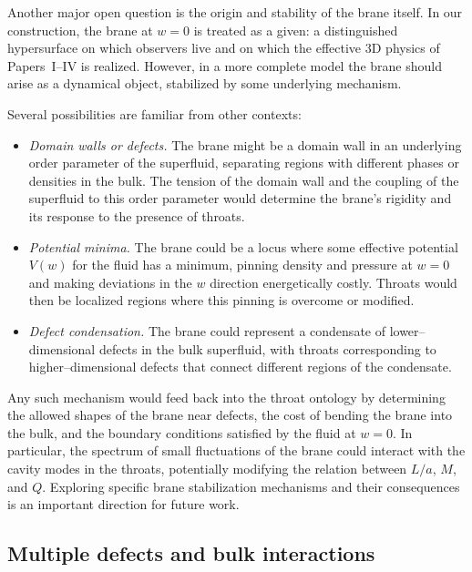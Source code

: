 \documentclass[12pt]{article}
\begin{document}
Another major open question is the origin and stability of the brane itself.
In our construction, the brane at $w=0$ is treated as a given: a
distinguished hypersurface on which observers live and on which the
effective 3D physics of Papers~I--IV is realized.  However, in a more
complete model the brane should arise as a dynamical object, stabilized by
some underlying mechanism.

Several possibilities are familiar from other contexts:

\begin{itemize}
  \item \emph{Domain walls or defects.}  The brane might be a domain wall in
        an underlying order parameter of the superfluid, separating regions
        with different phases or densities in the bulk.  The tension of the
        domain wall and the coupling of the superfluid to this order
        parameter would determine the brane's rigidity and its response to
        the presence of throats.

  \item \emph{Potential minima.}  The brane could be a locus where some
        effective potential $V(w)$ for the fluid has a minimum, pinning
        density and pressure at $w=0$ and making deviations in the $w$
        direction energetically costly.  Throats would then be localized
        regions where this pinning is overcome or modified.

  \item \emph{Defect condensation.}  The brane could represent a condensate
        of lower--dimensional defects in the bulk superfluid, with
        throats corresponding to higher--dimensional defects that connect
        different regions of the condensate.
\end{itemize}

Any such mechanism would feed back into the throat ontology by determining
the allowed shapes of the brane near defects, the cost of bending the brane
into the bulk, and the boundary conditions satisfied by the fluid at
$w=0$.  In particular, the spectrum of small fluctuations of the brane
could interact with the cavity modes in the throats, potentially modifying
the relation between $L/a$, $M$, and $Q$.  Exploring specific brane
stabilization mechanisms and their consequences is an important direction
for future work.

\subsection{Multiple defects and bulk interactions}
\label{subsec:multi_defects}
\end{document}
